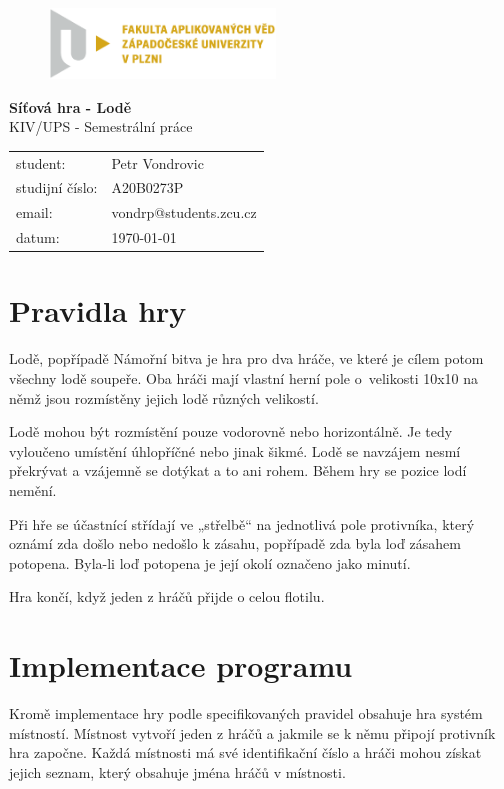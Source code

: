\documentclass[12pt, a4paper]{article} %
\begin{document}
	\begin{titlepage}
		\begin{figure}[H]
			\includegraphics[width=6cm]{images/FAV_cmyk.eps}
		\end{figure}
		\vspace{3cm}
		\begin{center}
			\huge{\textbf{Síťová hra - Lodě}} \\
			\Large KIV/UPS - Semestrální práce
		\end{center}
		\vfill
		\begin{table}[H]
			\begin{tabular}{l l}
				student: & Petr Vondrovic\\
				studijní číslo: & A20B0273P\\
				email: & vondrp@students.zcu.cz\\
				datum: & \today
			\end{tabular}
		\end{table}
	\end{titlepage}
	\pagebreak
	\setcounter{page}{2}
	\section{Pravidla hry}
	\par Lodě, popřípadě Námořní bitva je hra pro dva hráče, ve které je cílem potom všechny lodě soupeře. Oba hráči mají vlastní herní pole o velikosti 10x10 na němž jsou rozmístěny jejich lodě různých velikostí.
	
	\par Lodě mohou být rozmístění pouze vodorovně nebo horizontálně. Je tedy vyloučeno umístění úhlopříčné nebo jinak šikmé. Lodě se navzájem nesmí překrývat a vzájemně se dotýkat a to ani rohem. Během hry se pozice lodí nemění.
	
	
	\par Při hře se účastnící střídají ve  „střelbě“ na jednotlivá pole protivníka, který oznámí zda došlo nebo nedošlo k zásahu, popřípadě zda byla loď zásahem potopena. Byla-li loď potopena je její okolí označeno jako minutí.
	
	\par Hra končí, když jeden z hráčů přijde o celou flotilu.
		
	\section{Implementace programu}
	\par Kromě implementace hry podle specifikovaných pravidel obsahuje hra systém místností. Místnost vytvoří jeden z hráčů a jakmile se k němu připojí protivník hra započne. Každá místnosti má své identifikační číslo a hráči mohou získat jejich seznam, který obsahuje jména hráčů v místnosti.
		
\end{document}

